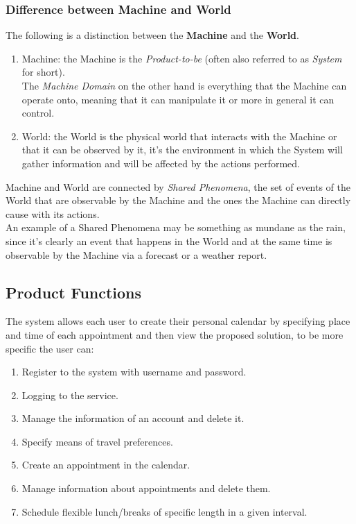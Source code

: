 \subsubsection*{Difference between Machine and World}
The following is a distinction between the \textbf{Machine} and the \textbf{World}.
\begin{enumerate}
\item Machine: the Machine is the \textit{Product-to-be} (often also referred to as \textit{System} for short).
\\The \textit{Machine Domain} on the other hand is everything that the Machine can operate onto, meaning that it can manipulate it or more in general it can control.
\item World: the World is the physical world that interacts with the Machine or that it can be observed by it, it's the environment in which the System will gather information and will be affected by the actions performed.
\end{enumerate}
Machine and World are connected by \textit{Shared Phenomena}, the set of events of the World that are observable by the Machine and the ones the Machine can directly cause with its actions.
\\An example of a Shared Phenomena may be something as mundane as the rain, since it's clearly an event that happens in the World and at the same time is observable by the Machine via a forecast or a weather report.
\clearpage
\subsection{Product Functions}
The system allows each user to create their personal calendar by specifying place and time of each appointment and then view the proposed solution, to be more specific the user can:
\begin{enumerate}
\item Register to the system with username and password.
\item Logging to the service.
\item Manage the information of an account and delete it.
\item Specify means of travel preferences.
\item Create an appointment in the calendar.
\item Manage information about appointments and delete them.
\item Schedule flexible lunch/breaks of specific length in a given interval.
\end{enumerate}
\par
